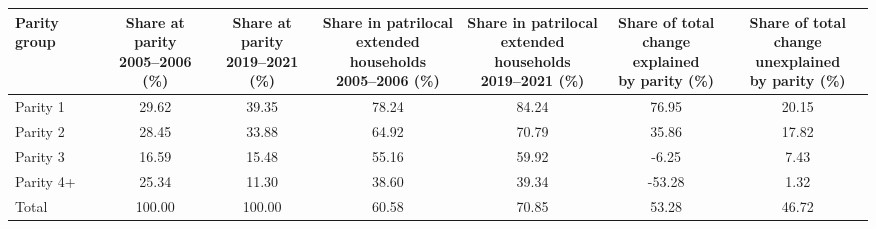\begin{tabular}{lcccccc}
\toprule
Parity group & \makecell{Share at parity\\2005--2006 (\%)} & \makecell{Share at parity\\2019--2021 (\%)} & \makecell{Share in patrilocal\\extended households\\2005--2006 (\%)} & \makecell{Share in patrilocal\\extended households\\2019--2021 (\%)} & \makecell{Share of total \\ change explained \\ by parity (\%)} & \makecell{Share of total \\ change unexplained \\ by parity (\%)} \\
\midrule
Parity 1&29.62&39.35&78.24&84.24&76.95&20.15\\
Parity 2&28.45&33.88&64.92&70.79&35.86&17.82\\
Parity 3&16.59&15.48&55.16&59.92&-6.25&7.43\\
Parity 4+&25.34&11.30&38.60&39.34&-53.28&1.32\\
Total&100.00&100.00&60.58&70.85&53.28&46.72\\
\bottomrule
\end{tabular}
